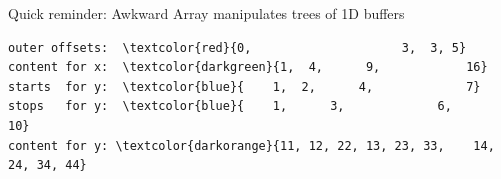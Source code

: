 \documentclass[aspectratio=169]{beamer}
\begin{document}
\begin{frame}[fragile]{Quick reminder: Awkward Array manipulates trees of 1D buffers}
\begin{onlyenv}
\vspace{0.25 cm}
\begin{Verbatim}[commandchars=\\\{\}]
outer offsets:  \textcolor{red}{0,                     3,  3, 5}
content for x:  \textcolor{darkgreen}{1,  4,      9,            16}
starts  for y:  \textcolor{blue}{    1,  2,      4,             7}
stops   for y:  \textcolor{blue}{    1,      3,             6,            10}
content for y: \textcolor{darkorange}{11, 12, 22, 13, 23, 33,    14, 24, 34, 44}
\end{Verbatim}
\vspace{5 cm}
\end{onlyenv}
\end{frame}

\begin{frame}{}
\vspace{0.5 cm}

\end{frame}
\end{document}
